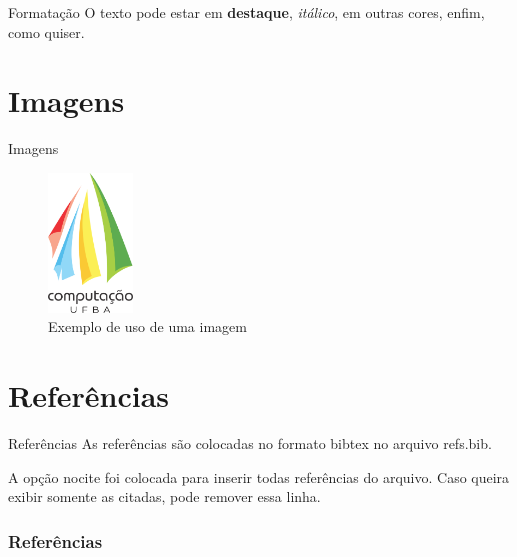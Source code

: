 \documentclass[aspectratio=169,xcolor=table]{beamer}
\begin{document}
\begin{frame}{Formatação}
    O texto pode estar em \textbf{destaque}, \textit{itálico}, em outras 
    {\color{red}cores}, enfim, como quiser.
\end{frame}

\section{Imagens}

\begin{frame}{Imagens}
    \begin{figure}
        \centering
        \includegraphics[width=0.2\textwidth]{dcc.png}
        \caption{Exemplo de uso de uma imagem}
    \end{figure}
\end{frame}

\section{Referências}
\nocite{*}

\begin{frame}{Referências}
    As referências são colocadas no formato bibtex no arquivo refs.bib.

    A opção nocite foi colocada para inserir todas referências do arquivo. Caso
    queira exibir somente as citadas, pode remover essa linha.
\end{frame}

\begin{frame}
        \frametitle{Referências}
        
        
\end{frame}
\end{document}
